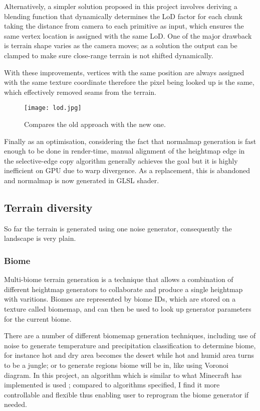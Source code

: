 \documentclass[oneside, a4paper]{article}
\begin{document}
    Alternatively, a simpler solution proposed in this project involves deriving a blending function that dynamically determines the LoD factor for each chunk taking the distance from camera to each primitive as input, which ensures the same vertex location is assigned with the same LoD. One of the major drawback is terrain shape varies as the camera moves; as a solution the output can be clamped to make sure close-range terrain is not shifted dynamically.
    
    With these improvements, vertices with the same position are always assigned with the same texture coordinate therefore the pixel being looked up is the same, which effectively removed seams from the terrain.

    \begin{figure}[H]
        \texttt{[image: lod.jpg]}
        \caption{Compares the old approach with the new one.}
    \end{figure}
    
    Finally as an optimisation, considering the fact that normalmap generation is fast enough to be done in render-time, manual alignment of the heightmap edge in the selective-edge copy algorithm generally achieves the goal but it is highly inefficient on GPU due to warp divergence. As a replacement, this is abandoned and normalmap is now generated in GLSL shader.

    \subsection{Terrain diversity}

    So far the terrain is generated using one noise generator, consequently the landscape is very plain.

    \subsubsection{Biome}

    Multi-biome terrain generation is a technique that allows a combination of different heightmap generators to collaborate and produce a single heightmap with varitions. Biomes are represented by biome IDs, which are stored on a texture called biomemap, and can then be used to look up generator parameters for the current biome.

    There are a number of different biomemap generation techniques, including use of noise to generate temperature and precipitation classification to determine biome, for instance hot and dry area becomes the desert while hot and humid area turns to be a jungle; or to generate regions biome will be in, like using Voronoi diagram. In this project, an algorithm which is similar to what Minecraft has implemented is used \cite{mc_biome}; compared to algorithms specified, I find it more controllable and flexible thus enabling user to reprogram the biome generator if needed.
\end{document}
